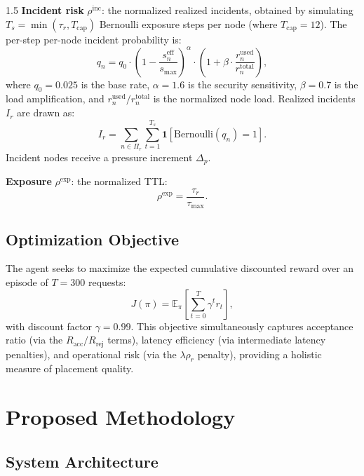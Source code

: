 \documentclass[A4paper,12pt]{report}
\theoremstyle{plain}
\theoremstyle{definition}
\theoremstyle{remark}
\numberwithin{equation}{section}
\begin{document}
\begin{spacing}{1.5}
\textbf{Incident risk} $\rho^{\text{inc}}$: the normalized realized incidents, obtained by simulating $T_s = \min(\tau_r, T_{\text{cap}})$ Bernoulli exposure steps per node (where $T_{\text{cap}} = 12$). The per-step per-node incident probability is:
\begin{equation}
q_n = q_0 \cdot \left(1 - \frac{s_n^{\text{eff}}}{s_{\max}}\right)^{\alpha} \cdot \left(1 + \beta \cdot \frac{r_n^{\text{used}}}{r_n^{\text{total}}}\right),
\end{equation}
where $q_0 = 0.025$ is the base rate, $\alpha = 1.6$ is the security sensitivity, $\beta = 0.7$ is the load amplification, and $r_n^{\text{used}}/r_n^{\text{total}}$ is the normalized node load. Realized incidents $I_r$ are drawn as:
\begin{equation}
I_r = \sum_{n \in \Pi_r} \sum_{t=1}^{T_s} \mathbf{1}\!\left[\text{Bernoulli}(q_n) = 1\right].
\end{equation}
Incident nodes receive a pressure increment $\Delta_p$.

\textbf{Exposure} $\rho^{\text{exp}}$: the normalized TTL:
\begin{equation}
\rho^{\text{exp}} = \frac{\tau_r}{\tau_{\max}}.
\end{equation}

\section{Optimization Objective}

The agent seeks to maximize the expected cumulative discounted reward over an episode of $T = 300$ requests:
\begin{equation}
J(\pi) = \mathbb{E}_{\pi}\!\left[\sum_{t=0}^{T} \gamma^t r_t\right],
\end{equation}
with discount factor $\gamma = 0.99$. This objective simultaneously captures acceptance ratio (via the $R_{\text{acc}} / R_{\text{rej}}$ terms), latency efficiency (via intermediate latency penalties), and operational risk (via the $\lambda \rho_r$ penalty), providing a holistic measure of placement quality.

\chapter{Proposed Methodology}

\section{System Architecture}


\end{spacing}
\end{document}
